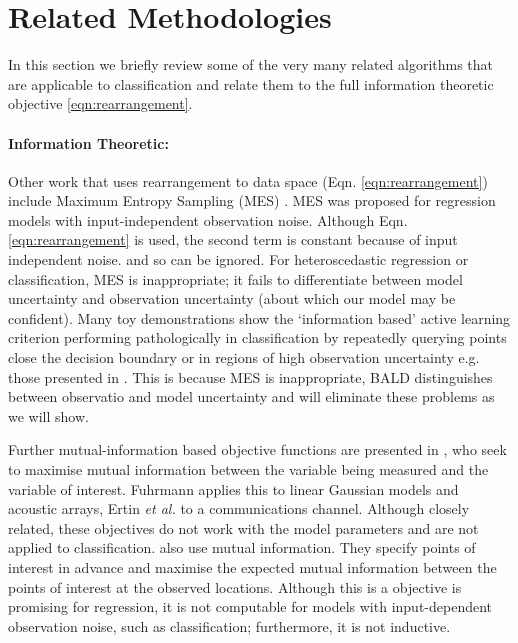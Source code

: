 \documentclass{article}
\newcommand{\ourmethod}{BALD } %
\begin{document}
\section{Related Methodologies}

In this section we briefly review some of the very many related algorithms that are applicable to classification and relate them to the full information theoretic objective \eqref{eqn:rearrangement}.

\paragraph{Information Theoretic:} Other work that uses rearrangement to data space (Eqn. \eqref{eqn:rearrangement}) include Maximum Entropy Sampling (MES) \cite{sebastiani2000}. MES was proposed for regression models with input-independent observation noise. Although Eqn. \eqref{eqn:rearrangement} is used, the second term is constant because of input independent noise. and so can be ignored. For heteroscedastic regression or classification, MES is inappropriate; it fails to differentiate between model uncertainty and observation uncertainty (about which our model may be confident). Many toy demonstrations show the `information based' active learning criterion performing pathologically in classification by repeatedly querying points close the decision boundary or in regions of high observation uncertainty  e.g. those presented in \cite{dasgupta2008, huang2010}. This is because MES is inappropriate, \ourmethod distinguishes between observatio and model uncertainty and will eliminate these problems as we will show.

Further mutual-information based objective functions are presented in \cite{ertin2003,fuhrmann2003}, who seek to maximise mutual information between the variable being measured and the variable of interest. Fuhrmann \cite{fuhrmann2003} applies this to linear Gaussian models and acoustic arrays, Ertin \emph{et al.} \cite{ertin2003} to a communications channel. Although closely related, these objectives do not work with the model parameters and are not applied to classification. \cite{guestrin2005, krause2006, krause2007} also use mutual information. They specify points of interest in advance and maximise the expected mutual information between the points of interest at the observed locations. Although this is a objective is promising for regression, it is not computable for models with input-dependent observation noise, such as classification; furthermore, it is not inductive.
\end{document}
